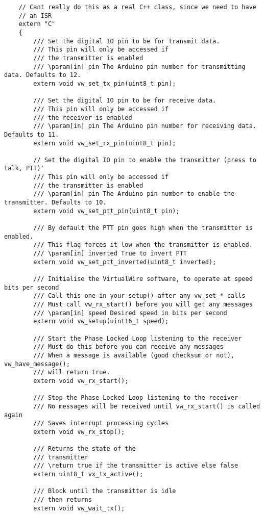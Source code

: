 \begin{verbatim}
    // Cant really do this as a real C++ class, since we need to have 
    // an ISR
    extern "C"
    {
        /// Set the digital IO pin to be for transmit data. 
        /// This pin will only be accessed if
        /// the transmitter is enabled
        /// \param[in] pin The Arduino pin number for transmitting data. Defaults to 12.
        extern void vw_set_tx_pin(uint8_t pin);

        /// Set the digital IO pin to be for receive data.
        /// This pin will only be accessed if
        /// the receiver is enabled
        /// \param[in] pin The Arduino pin number for receiving data. Defaults to 11.
        extern void vw_set_rx_pin(uint8_t pin);

        // Set the digital IO pin to enable the transmitter (press to talk, PTT)'
        /// This pin will only be accessed if
        /// the transmitter is enabled
        /// \param[in] pin The Arduino pin number to enable the transmitter. Defaults to 10.
        extern void vw_set_ptt_pin(uint8_t pin);

        /// By default the PTT pin goes high when the transmitter is enabled.
        /// This flag forces it low when the transmitter is enabled.
        /// \param[in] inverted True to invert PTT
        extern void vw_set_ptt_inverted(uint8_t inverted);

        /// Initialise the VirtualWire software, to operate at speed bits per second
        /// Call this one in your setup() after any vw_set_* calls
        /// Must call vw_rx_start() before you will get any messages
        /// \param[in] speed Desired speed in bits per second
        extern void vw_setup(uint16_t speed);

        /// Start the Phase Locked Loop listening to the receiver
        /// Must do this before you can receive any messages
        /// When a message is available (good checksum or not), vw_have_message();
        /// will return true.
        extern void vw_rx_start();

        /// Stop the Phase Locked Loop listening to the receiver
        /// No messages will be received until vw_rx_start() is called again
        /// Saves interrupt processing cycles
        extern void vw_rx_stop();

        /// Returns the state of the
        /// transmitter
        /// \return true if the transmitter is active else false
        extern uint8_t vx_tx_active();

        /// Block until the transmitter is idle
        /// then returns
        extern void vw_wait_tx();


\end{verbatim}
